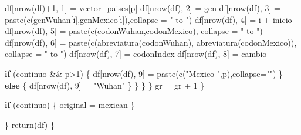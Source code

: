 \documentclass[
  12pt,
]{article}
\newenvironment{Shaded}{\begin{snugshade}}{\end{snugshade}}
\newcommand{\AttributeTok}[1]{\textcolor[rgb]{0.77,0.63,0.00}{#1}}
\newcommand{\ControlFlowTok}[1]{\textcolor[rgb]{0.13,0.29,0.53}{\textbf{#1}}}
\newcommand{\DecValTok}[1]{\textcolor[rgb]{0.00,0.00,0.81}{#1}}
\newcommand{\FunctionTok}[1]{\textcolor[rgb]{0.00,0.00,0.00}{#1}}
\newcommand{\NormalTok}[1]{#1}
\newcommand{\OtherTok}[1]{\textcolor[rgb]{0.56,0.35,0.01}{#1}}
\newcommand{\SpecialCharTok}[1]{\textcolor[rgb]{0.00,0.00,0.00}{#1}}
\newcommand{\StringTok}[1]{\textcolor[rgb]{0.31,0.60,0.02}{#1}}
\begin{document}
\begin{Shaded}
\begin{Highlighting}[]
\NormalTok{            df[}\FunctionTok{nrow}\NormalTok{(df)}\SpecialCharTok{+}\DecValTok{1}\NormalTok{, }\DecValTok{1}\NormalTok{] }\OtherTok{=}\NormalTok{ vector\_paises[p]}
\NormalTok{            df[}\FunctionTok{nrow}\NormalTok{(df), }\DecValTok{2}\NormalTok{] }\OtherTok{=}\NormalTok{ gen}
\NormalTok{            df[}\FunctionTok{nrow}\NormalTok{(df), }\DecValTok{3}\NormalTok{] }\OtherTok{=} \FunctionTok{paste}\NormalTok{(}\FunctionTok{c}\NormalTok{(genWuhan[i],genMexico[i]),}\AttributeTok{collapse =} \StringTok{" to "}\NormalTok{)}
\NormalTok{            df[}\FunctionTok{nrow}\NormalTok{(df), }\DecValTok{4}\NormalTok{] }\OtherTok{=}\NormalTok{ i }\SpecialCharTok{+}\NormalTok{ inicio}
\NormalTok{            df[}\FunctionTok{nrow}\NormalTok{(df), }\DecValTok{5}\NormalTok{] }\OtherTok{=} \FunctionTok{paste}\NormalTok{(}\FunctionTok{c}\NormalTok{(codonWuhan,codonMexico), }\AttributeTok{collapse =} \StringTok{" to "}\NormalTok{) }
\NormalTok{            df[}\FunctionTok{nrow}\NormalTok{(df), }\DecValTok{6}\NormalTok{] }\OtherTok{=} \FunctionTok{paste}\NormalTok{(}\FunctionTok{c}\NormalTok{(}\FunctionTok{abreviatura}\NormalTok{(codonWuhan), }\FunctionTok{abreviatura}\NormalTok{(codonMexico)), }\AttributeTok{collapse =} \StringTok{" to "}\NormalTok{)}
\NormalTok{            df[}\FunctionTok{nrow}\NormalTok{(df), }\DecValTok{7}\NormalTok{] }\OtherTok{=}\NormalTok{ codonIndex}
\NormalTok{            df[}\FunctionTok{nrow}\NormalTok{(df), }\DecValTok{8}\NormalTok{] }\OtherTok{=}\NormalTok{ cambio}
            
            \ControlFlowTok{if}\NormalTok{ (continuo }\SpecialCharTok{\&\&}\NormalTok{ p}\SpecialCharTok{\textgreater{}}\DecValTok{1}\NormalTok{) \{}
\NormalTok{              df[}\FunctionTok{nrow}\NormalTok{(df), }\DecValTok{9}\NormalTok{] }\OtherTok{=} \FunctionTok{paste}\NormalTok{(}\FunctionTok{c}\NormalTok{(}\StringTok{"Mexico "}\NormalTok{,p),}\AttributeTok{collapse=}\StringTok{""}\NormalTok{)}
\NormalTok{            \} }\ControlFlowTok{else}\NormalTok{ \{}
\NormalTok{              df[}\FunctionTok{nrow}\NormalTok{(df), }\DecValTok{9}\NormalTok{] }\OtherTok{=} \StringTok{"Wuhan"}
\NormalTok{            \}}
\NormalTok{          \}}
\NormalTok{        \}}
\NormalTok{      \}}
\NormalTok{      gr }\OtherTok{=}\NormalTok{ gr }\SpecialCharTok{+} \DecValTok{1}
\NormalTok{    \}}
    
    \ControlFlowTok{if}\NormalTok{ (continuo) \{}
\NormalTok{      original }\OtherTok{=}\NormalTok{ mexican}
\NormalTok{    \}}
    
    
\NormalTok{  \}}
  \FunctionTok{return}\NormalTok{(df)}
\NormalTok{\}}
\end{Highlighting}
\end{Shaded}
\end{document}
